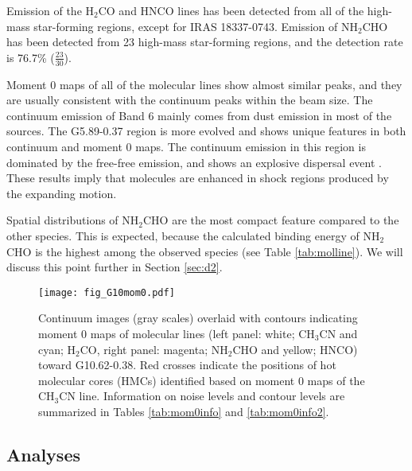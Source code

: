 \documentclass[twocolumn, twocolappendix]{aastex631}
\begin{document}
Emission of the H$_{2}$CO and HNCO lines has been detected from all of the high-mass star-forming regions, except for IRAS 18337-0743.
Emission of NH$_{2}$CHO has been detected from 23 high-mass star-forming regions, and the detection rate is 76.7\% ($\frac{23}{30}$).

Moment 0 maps of all of the molecular lines show almost similar peaks, and they are usually consistent with the continuum peaks within the beam size.
The continuum emission of Band 6 mainly comes from dust emission in most of the sources.
The G5.89-0.37 region is more evolved and shows unique features in both continuum and moment 0 maps.
The continuum emission in this region is dominated by the free-free emission, and shows an explosive dispersal event \citep{2021ApJ...913...29F}.
These results imply that molecules are enhanced in shock regions produced by the expanding motion.

Spatial distributions of NH$_{2}$CHO are the most compact feature compared to the other species. 
This is expected, because the calculated binding energy of NH$_{2}$CHO is the highest among the observed species (see Table \ref{tab:molline}). 
We will discuss this point further in Section \ref{sec:d2}.

\begin{figure}[!th]
 \begin{center}
  \texttt{[image: fig\_G10mom0.pdf]}
 \end{center}
\caption{Continuum images (gray scales) overlaid with contours indicating moment 0 maps of molecular lines (left panel: white; CH$_{3}$CN and cyan; H$_{2}$CO, right panel: magenta; NH$_{2}$CHO and yellow; HNCO) toward G10.62-0.38. Red crosses indicate the positions of hot molecular cores (HMCs) identified based on moment 0 maps of the CH$_{3}$CN line. Information on noise levels and contour levels are summarized in Tables \ref{tab:mom0info} and \ref{tab:mom0info2}. \label{fig:momG10}}
\end{figure}

\subsection{Analyses} \label{sec:ana}
\end{document}

